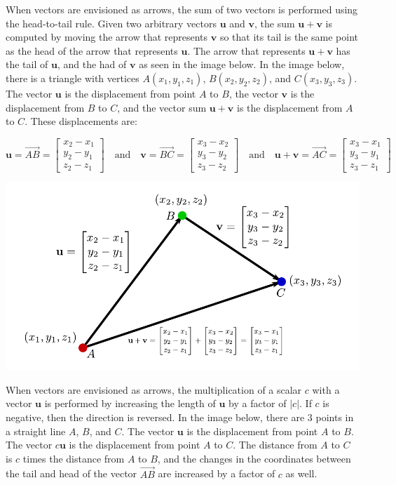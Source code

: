 \documentclass{article}
\begin{document}
When vectors are envisioned as arrows, the sum of two vectors is performed using the head-to-tail rule. Given two arbitrary vectors \(\mathbf{u}\) and \(\mathbf{v}\), the sum \(\mathbf{u} + \mathbf{v}\) is computed by moving the arrow that represents \(\mathbf{v}\) so that its tail is the same point as the head of the arrow that represents \(\mathbf{u}\). The arrow that represents \(\mathbf{u} + \mathbf{v}\) has the tail of \(\mathbf{u}\), and the had of \(\mathbf{v}\) as seen in the image below. In the image below, there is a triangle with vertices \(A(x_1, y_1, z_1)\), \(B(x_2, y_2, z_2)\), and \(C(x_3, y_3, z_3)\). The vector \(\mathbf{u}\) is the displacement from point \(A\) to \(B\), the vector \(\mathbf{v}\) is the displacement from \(B\) to \(C\), and the vector sum \(\mathbf{u} + \mathbf{v}\) is the displacement from \(A\) to \(C\). These displacements are:

\[\mathbf{u} = \overrightarrow{AB} = \begin{bmatrix} x_2 - x_1 \\ y_2 - y_1 \\ z_2 - z_1 \end{bmatrix} \quad\text{and}\quad \mathbf{v} = \overrightarrow{BC} = \begin{bmatrix} x_3 - x_2 \\ y_3 - y_2 \\ z_3 - z_2 \end{bmatrix} \quad\text{and}\quad \mathbf{u}+\mathbf{v} = \overrightarrow{AC} = \begin{bmatrix} x_3 - x_1 \\ y_3 - y_1 \\ z_3 - z_1 \end{bmatrix}\]

\includegraphics[width = \textwidth]{displacement_addition}


When vectors are envisioned as arrows, the multiplication of a scalar \(c\) with a vector \(\mathbf{u}\) is performed by increasing the length of \(\mathbf{u}\) by a factor of \(|c|\). If \(c\) is negative, then the direction is reversed. In the image below, there are \(3\) points in a straight line \(A\), \(B\), and \(C\). The vector \(\mathbf{u}\) is the displacement from point \(A\) to \(B\). The vector \(c\mathbf{u}\) is the displacement from point \(A\) to \(C\). The distance from \(A\) to \(C\) is \(c\) times the distance from \(A\) to \(B\), and the changes in the coordinates between the tail and head of the vector \(\overrightarrow{AB}\) are increased by a factor of \(c\) as well.
\end{document}
